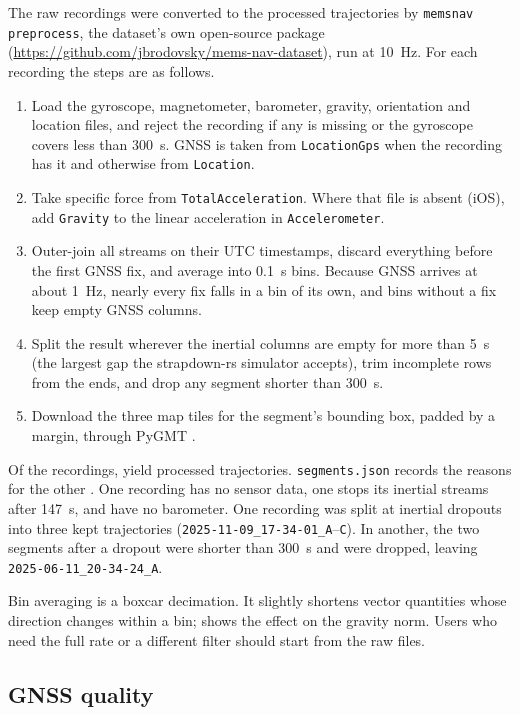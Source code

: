 The raw recordings were converted to the processed trajectories by \texttt{memsnav preprocess}, the dataset's own open-source package (\url{https://github.com/jbrodovsky/mems-nav-dataset}), run at 10~Hz. For each recording the steps are as follows.
\begin{enumerate}
\item Load the gyroscope, magnetometer, barometer, gravity, orientation and location files, and reject the recording if any is missing or the gyroscope covers less than 300~s. GNSS is taken from \texttt{LocationGps} when the recording has it and otherwise from \texttt{Location}.
\item Take specific force from \texttt{TotalAcceleration}. Where that file is absent (iOS), add \texttt{Gravity} to the linear acceleration in \texttt{Accelerometer}.
\item Outer-join all streams on their UTC timestamps, discard everything before the first GNSS fix, and average into 0.1~s bins. Because GNSS arrives at about 1~Hz, nearly every fix falls in a bin of its own, and bins without a fix keep empty GNSS columns.
\item Split the result wherever the inertial columns are empty for more than 5~s (the largest gap the strapdown-rs simulator accepts), trim incomplete rows from the ends, and drop any segment shorter than 300~s.
\item Download the three map tiles for the segment's bounding box, padded by a margin, through PyGMT \citep{wessel2019gmt}.
\end{enumerate}
Of the \numRawRecordings{} recordings, \numUsedRecordings{} yield processed trajectories. \texttt{segments.json} records the reasons for the other \numExcludedRecordings{}. One recording has no sensor data, one stops its inertial streams after 147~s, and \numNoBaroRecordings{} have no barometer. One recording was split at inertial dropouts into three kept trajectories (\texttt{2025-11-09\_17-34-01\_A}--\texttt{C}). In another, the two segments after a dropout were shorter than 300~s and were dropped, leaving \texttt{2025-06-11\_20-34-24\_A}.

Bin averaging is a boxcar decimation. It slightly shortens vector quantities whose direction changes within a bin;  shows the effect on the gravity norm. Users who need the full rate or a different filter should start from the raw files.

\subsection{GNSS quality}
\label{sec:gnss}

